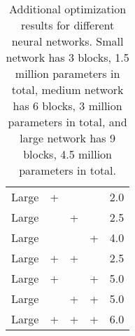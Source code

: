 \begin{table}[htbp]
\begin{tabular}{ccccc}
        Large        & +               &                        &                & 2.0     \\
        Large        &                 & +                      &                & 2.5     \\
        Large        &                 &                        & +              & 4.0     \\
        Large        & +               & +                      &                & 2.5     \\
        Large        & +               &                        & +              & 5.0     \\
        Large        &                 & +                      & +              & 5.0     \\
        Large        & +               & +                      & +              & 6.0     \\
        \bottomrule
    \end{tabular}
    \caption{Additional optimization results for different neural networks. Small network has 3 blocks, 1.5 million
        parameters in total, medium network has 6 blocks, 3 million parameters in total, and large network has 9 blocks,
        4.5 million parameters in total.}
    \label{tab:additional_optimization}
\end{table}
